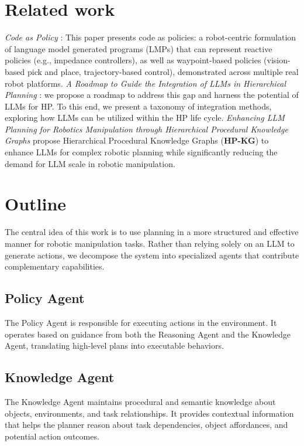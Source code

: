 \documentclass{article} %
\begin{document}
\section{Related work}
\textit{Code as Policy} \cite{code_policy} : This paper presents code as policies: a robot-centric formulation of language model generated programs (LMPs) that can represent reactive policies (e.g., impedance controllers), as well as waypoint-based policies (vision-based pick and place, trajectory-based control), demonstrated across multiple real robot platforms. \textit{A Roadmap to Guide the Integration of LLMs in Hierarchical Planning} \cite{roadmap_llm_hp}: we propose a roadmap to address this gap and harness the potential of LLMs for HP. To this end, we present a taxonomy of integration methods, exploring how LLMs can be utilized within the HP life cycle. \textit{Enhancing LLM Planning for Robotics Manipulation through Hierarchical Procedural Knowledge Graphs} \cite{knowledge_graph} propose Hierarchical Procedural Knowledge Graphs (\textbf{HP-KG}) to enhance LLMs for complex robotic planning while significantly reducing the demand for LLM scale in robotic manipulation.   

\section{Outline}

The central idea of this work is to use planning in a more structured and effective manner for robotic manipulation tasks. Rather than relying solely on an LLM to generate actions, we decompose the system into specialized agents that contribute complementary capabilities.

\subsection{Policy Agent}

The Policy Agent is responsible for executing actions in the environment. It operates based on guidance from both the Reasoning Agent and the Knowledge Agent, translating high-level plans into executable behaviors.

\subsection{Knowledge Agent}

The Knowledge Agent maintains procedural and semantic knowledge about objects, environments, and task relationships. It provides contextual information that helps the planner reason about task dependencies, object affordances, and potential action outcomes.
\end{document}
